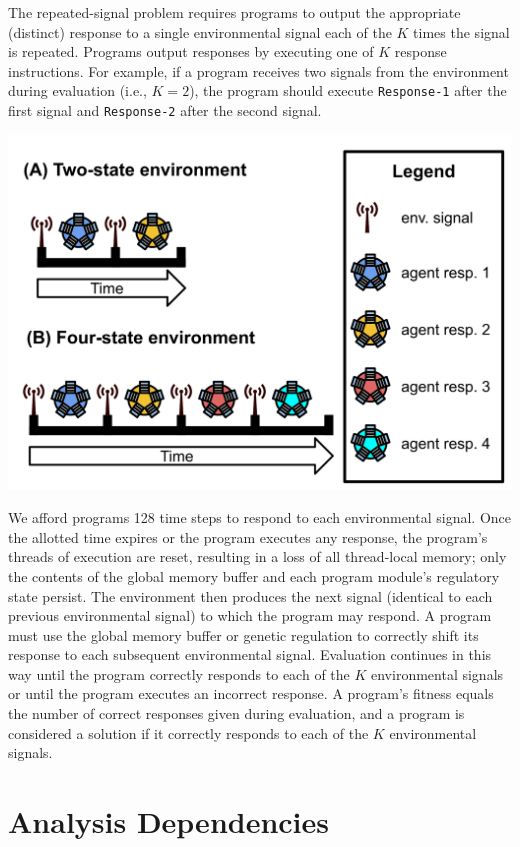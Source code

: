 \documentclass[
]{book}
\begin{document}
The repeated-signal problem requires programs to output the appropriate (distinct) response to a single environmental signal each of the \(K\) times the signal is repeated.
Programs output responses by executing one of \(K\) response instructions.
For example, if a program receives two signals from the environment during evaluation (i.e., \(K=2\)), the program should execute \texttt{Response-1} after the first signal and \texttt{Response-2} after the second signal.

\includegraphics{experiments/2020-11-25-rep-sig/analysis/../../../media/repeated-signal-task.png}

We afford programs 128 time steps to respond to each environmental signal.
Once the allotted time expires or the program executes any response, the program's threads of execution are reset, resulting in a loss of all thread-local memory; only the contents of the global memory buffer and each program module's regulatory state persist.
The environment then produces the next signal (identical to each previous environmental signal) to which the program may respond.
A program must use the global memory buffer or genetic regulation to correctly shift its response to each subsequent environmental signal.
Evaluation continues in this way until the program correctly responds to each of the \(K\) environmental signals or until the program executes an incorrect response.
A program's fitness equals the number of correct responses given during evaluation, and a program is considered a solution if it correctly responds to each of the \(K\) environmental signals.

\hypertarget{analysis-dependencies-1}{%
\section{Analysis Dependencies}\label{analysis-dependencies-1}}
\end{document}

